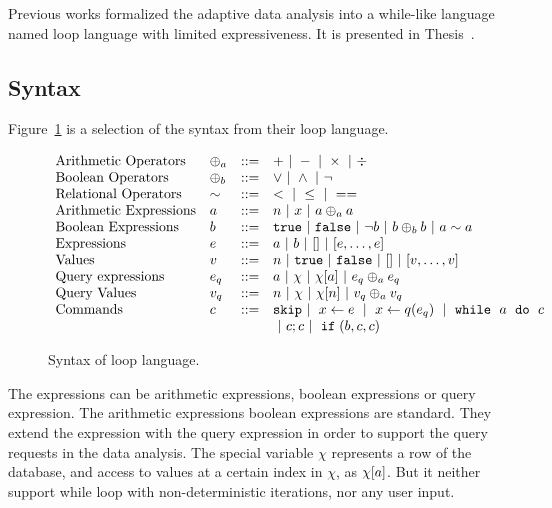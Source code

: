 Previous works formalized the adaptive data analysis into a while-like language named loop language with  limited expressiveness.
It is presented in {Thesis~\cite{weihao22}}.
\subsection*{Syntax}
Figure~\ref{fig:prework_syntax} is a selection of the syntax from their loop language.
{\small
\begin{figure}
\[
\begin{array}{llll}
 \mbox{Arithmetic Operators} & \oplus_a & ::= & + ~|~ - ~|~ \times 
%
~|~ \div \\  
  \mbox{Boolean Operators} & \oplus_b & ::= & \lor ~|~ \land ~|~ \neg\\
   \mbox{Relational Operators} & \sim & ::= & < ~|~ \leq ~|~ == \\  
\mbox{Arithmetic Expressions} & \aexpr & ::= & 
	n ~|~ x ~|~ \aexpr \oplus_a \aexpr  \\
\mbox{Boolean Expressions} & \bexpr & ::= & 
	\etrue ~|~ \efalse  ~|~ \neg \bexpr
	 ~|~ \bexpr \oplus_b \bexpr
	~|~ \aexpr \sim \aexpr \\
\mbox{Expressions} & \expr & ::= & \aexpr ~|~ \bexpr ~|~ [] ~|~ [\expr, \dots, \expr] \\	
\mbox{Values} & v & ::= & n ~|~ \etrue ~|~ \efalse ~|~ [] ~|~ [v, \dots, v] \\
\mbox{Query expressions} & \expr_q & ::= & \aexpr ~|~ \chi ~|~ \chi[\aexpr] ~|~ \expr_q \oplus_a \expr_q \\
\mbox{Query Values} & v_q & ::= & n ~|~ \chi ~|~ \chi[n] ~|~ v_q \oplus_a  v_q \\
\mbox{Commands} & c & ::= &  \eskip  ~|~  \assign x \expr ~|~  \assign{x}{ q(\expr_q)}
%
~|~ \eloop ~ \aexpr  ~ \edo ~ c  \\ &&& ~|~ c;c  ~|~ \eif(\bexpr, c, c)
\end{array}
\]
 \caption{Syntax of loop language.}
    \label{fig:prework_syntax}
\end{figure}
}
The expressions can be arithmetic expressions, boolean expressions or query expression.
The arithmetic expressions boolean expressions are standard.
They extend the expression with the query expression in order to support the query requests in the data analysis.
The special variable $\chi$ represents a row of the database,
and access to values at a certain index in $\chi$, as $\chi[a]$.
But it neither  support while loop with non-deterministic iterations, nor any user input.
%
